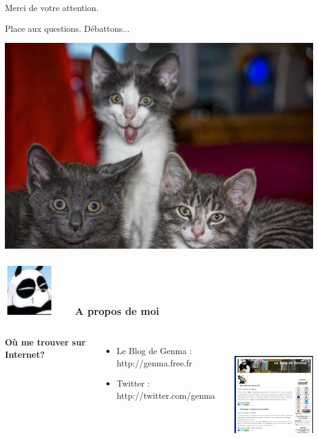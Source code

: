 \documentclass{beamer}
\begin{document}
\begin{frame}
\Huge{\centerline{Merci de votre attention.}}
\Huge{\centerline{Place aux questions. Débattons...}}
\begin{center}
\includegraphics[scale=0.2]{./images/chat.jpg}
\end{center}
\end{frame}

\begin{frame}
\frametitle{\includegraphics[scale=0.4]{./images/Genma.jpg} \ \ \  A propos de moi  }
\begin{columns}[c] 

\textbf{Où me trouver sur Internet?}
\begin{itemize}
\item Le Blog de Genma : http://genma.free.fr
\item Twitter : http://twitter.com/genma
\end{itemize}

\includegraphics[width=5cm,height=5cm]{./images/blog.png} 
\end{columns}
\end{frame}
\end{document}
